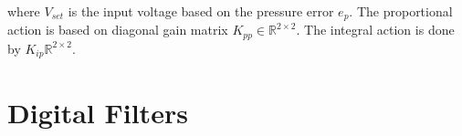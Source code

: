 where $V_{set}$ is the input voltage based on the pressure error $e_p$. The proportional action is based on diagonal gain matrix $K_{pp} \in \mathbb{R}^{2\times 2}$. The integral action is done by $K_{ip}\mathbb{R}^{2\times 2}$.


\section{Digital Filters}






































